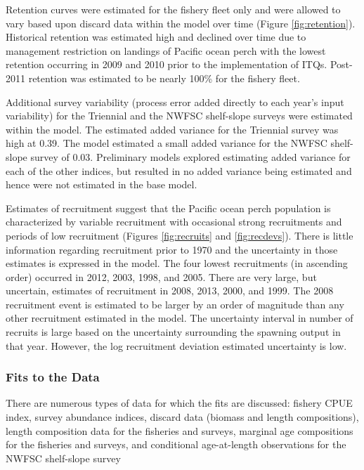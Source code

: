 \documentclass[12pt,]{article}
\begin{document}
Retention curves were estimated for the fishery fleet only and were
allowed to vary based upon discard data within the model over time
(Figure \ref{fig:retention}). Historical retention was estimated high
and declined over time due to management restriction on landings of
Pacific ocean perch with the lowest retention occurring in 2009 and 2010
prior to the implementation of ITQs. Post-2011 retention was estimated
to be nearly 100\% for the fishery fleet.

Additional survey variability (process error added directly to each
year's input variability) for the Triennial and the NWFSC shelf-slope
surveys were estimated within the model. The estimated added variance
for the Triennial survey was high at 0.39. The model estimated a small
added variance for the NWFSC shelf-slope survey of 0.03. Preliminary
models explored estimating added variance for each of the other indices,
but resulted in no added variance being estimated and hence were not
estimated in the base model.

Estimates of recruitment suggest that the Pacific ocean perch population
is characterized by variable recruitment with occasional strong
recruitments and periods of low recruitment (Figures \ref{fig:recruits}
and \ref{fig:recdevs}). There is little information regarding
recruitment prior to 1970 and the uncertainty in those estimates is
expressed in the model. The four lowest recruitments (in ascending
order) occurred in 2012, 2003, 1998, and 2005. There are very large, but
uncertain, estimates of recruitment in 2008, 2013, 2000, and 1999. The
2008 recruitment event is estimated to be larger by an order of
magnitude than any other recruitment estimated in the model. The
uncertainty interval in number of recruits is large based on the
uncertainty surrounding the spawning output in that year. However, the
log recruitment deviation estimated uncertainty is low.

\subsubsection{Fits to the Data}\label{fits-to-the-data}

There are numerous types of data for which the fits are discussed:
fishery CPUE index, survey abundance indices, discard data (biomass and
length compositions), length composition data for the fisheries and
surveys, marginal age compositions for the fisheries and surveys, and
conditional age-at-length observations for the NWFSC shelf-slope survey
\end{document}
